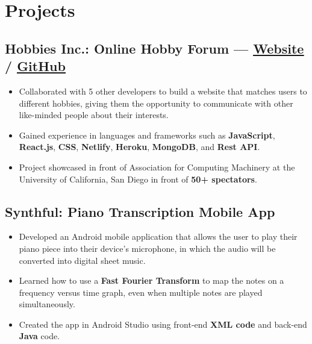 \documentclass[a4,10pt]{article}
\newenvironment{zitemize}{
\begin{itemize}\itemsep0pt \parskip0pt \parsep1pt}
{\end{itemize}\vspace{-0.5cm}}
\begin{document}
\section{Projects} %



\subsection*{Hobbies Inc.: Online Hobby Forum — {\normalsize\normalfont \href{https://hobbies-inc.netlify.app/}{{\underline{\textcolor{linkblue}{Website}}}} / \href{https://github.com/acmucsd-projects/wi21-dolphin}{{\underline{\textcolor{linkblue}{GitHub}}}}} \hfill} 
    \begin{zitemize}
        \item Collaborated with 5 other developers to build a website that matches users to different hobbies, giving them the opportunity to communicate with other like-minded people about their interests.
        \item Gained experience in languages and frameworks such as \textbf{JavaScript}, \textbf{React.js}, \textbf{CSS}, \textbf{Netlify}, \textbf{Heroku}, \textbf{MongoDB}, and \textbf{Rest API}.
        \item Project showcased in front of Association for Computing Machinery at the University of California, San Diego in front of \textbf{50+ spectators}.
    \end{zitemize}


\subsection*{Synthful: Piano Transcription Mobile App {\normalsize\normalfont} \hfill} 
    \begin{zitemize}
        \item Developed an Android mobile application that allows the user to play their piano piece into their device's microphone, in which the audio will be converted into digital sheet music.
        \item Learned how to use a \textbf{Fast Fourier Transform} to map the notes on a frequency versus time graph, even when multiple notes are played simultaneously.
        \item Created the app in Android Studio using front-end \textbf{XML code} and back-end \textbf{Java} code.
    \end{zitemize}
\end{document}
